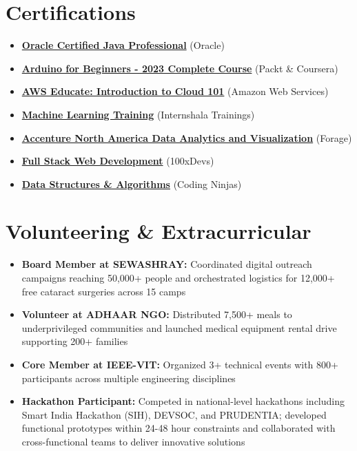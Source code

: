 \documentclass[a4paper,10pt]{article}
\newcommand{\resumeCertHeading}[2]{
  \textbf{\href{#2}{#1}} \small\faExternalLink
}
\newcommand{\resumeSubHeadingListStart}{\begin{itemize}[leftmargin=0.15in, label={}]}
\newcommand{\resumeSubHeadingListEnd}{\end{itemize}\vspace{1pt}}
\begin{document}
\section{Certifications}
  \resumeSubHeadingListStart
  \item \resumeCertHeading{Oracle Certified Java Professional}{https://drive.google.com/file/d/1dQfPHSahw2eZH-hK-pE3F1AxRqmxgzQ6/view?usp=sharing} \small (Oracle)
  \item \resumeCertHeading{Arduino for Beginners - 2023 Complete Course}{https://drive.google.com/file/d/1DEVnKf0tmYcPJbmjpOmOiwgzvoEjVvNF/view?usp=sharing} \small (Packt \& Coursera)
  \item \resumeCertHeading{AWS Educate: Introduction to Cloud 101}{https://www.credly.com/badges/30e58d35-8ec9-4f57-8eea-32d798b0a6ac/linked_in_profile} \small (Amazon Web Services)
  \item \resumeCertHeading{Machine Learning Training}{https://drive.google.com/file/d/1sDeYrKjmWjQvLsUELjw9pqh19mDjXeyM/view?usp=sharing} \small (Internshala Trainings)
  \item \resumeCertHeading{Accenture North America Data Analytics and Visualization}{https://drive.google.com/file/d/16V7h7nC9_P8IzcdOgObJwXHLI3cXcwhR/view?usp=sharing} \small (Forage)
  \item \resumeCertHeading{Full Stack Web Development}{https://drive.google.com/file/d/12N4lzrZiDkrZ5nRxv4KHrBVdBl7rR_fJ/view?usp=sharing} \small (100xDevs)
  \item \resumeCertHeading{Data Structures \& Algorithms}{https://drive.google.com/file/d/1i1aeZ2aoM5dYmKu09wcMRlO4xNFqUdOd/view?usp=sharing} \small (Coding Ninjas)
\resumeSubHeadingListEnd


\section{Volunteering \& Extracurricular}
  \resumeSubHeadingListStart
    \item \textbf{Board Member at SEWASHRAY:} Coordinated digital outreach campaigns reaching 50,000+ people and orchestrated logistics for 12,000+ free cataract surgeries across 15 camps
    \item \textbf{Volunteer at ADHAAR NGO:} Distributed 7,500+ meals to underprivileged communities and launched medical equipment rental drive supporting 200+ families
    \item \textbf{Core Member at IEEE-VIT:} Organized 3+ technical events with 800+ participants across multiple engineering disciplines
    \item \textbf{Hackathon Participant:} Competed in national-level hackathons including Smart India Hackathon (SIH), DEVSOC, and PRUDENTIA; developed functional prototypes within 24-48 hour constraints and collaborated with cross-functional teams to deliver innovative solutions
  \resumeSubHeadingListEnd
\end{document}
